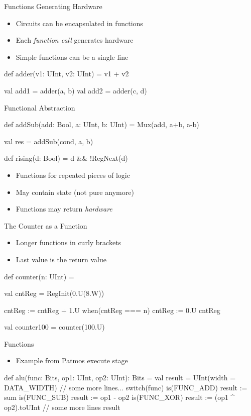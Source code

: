 \begin{frame}[fragile]{Functions Generating Hardware}
\begin{itemize}
\item Circuits can be encapsulated in functions
\item Each \emph{function call} generates hardware
\item Simple functions can be a single line
\end{itemize}
\begin{chisel}
  def adder(v1: UInt, v2: UInt) = v1 + v2
  
  val add1 = adder(a, b)
  val add2 = adder(c, d)
\end{chisel}
\end{frame}



\begin{frame}[fragile]{Functional Abstraction}
\begin{chisel}
  def addSub(add: Bool, a: UInt, b: UInt) =
    Mux(add, a+b, a-b)

  val res = addSub(cond, a, b)
  
  def rising(d: Bool) = d && !RegNext(d)
\end{chisel}
\begin{itemize}
\item Functions for repeated pieces of logic
\item May contain state (not pure anymore)
\item Functions may return \emph{hardware}
\end{itemize}
\end{frame}

\begin{frame}[fragile]{The Counter as a Function}
\begin{itemize}
\item Longer functions in curly brackets
\item Last value is the return value
\end{itemize}
\begin{chisel}
def counter(n: UInt) = {
  
  val cntReg = RegInit(0.U(8.W))
  
  cntReg := cntReg + 1.U
  when(cntReg === n) {
    cntReg := 0.U
  }
  cntReg
}

val counter100 = counter(100.U)
\end{chisel}
\end{frame}


\begin{frame}[fragile]{Functions}
\begin{itemize}
\item Example from Patmos execute stage
\end{itemize}
\begin{chisel}
def alu(func: Bits, op1: UInt, op2: UInt): Bits = {
  val result = UInt(width = DATA_WIDTH)
  // some more lines...
  switch(func) {
    is(FUNC_ADD) { result := sum }
    is(FUNC_SUB) { result := op1 - op2 }
    is(FUNC_XOR) { result := (op1 ^ op2).toUInt }
    // some more lines
  }
  result
}
\end{chisel}
\end{frame}




